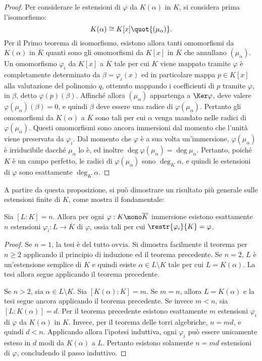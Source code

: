 \documentclass[12pt]{scrartcl}
\begin{document}
	\begin{proof}
		Per considerare le estensioni di $\varphi$ da $K(\alpha)$ in
		$K$, si considera prima l'isomorfismo:
		\[ K(\alpha) \cong K[x] \quot{(\mu_\alpha)}. \]
		Per il Primo teorema di isomorfismo, esistono
		allora tanti omomorfismi da $K(\alpha)$ in $\overline{K}$
		quanti sono gli omomorfismi da $K[x]$ in $\overline{K}$ che
		annullano $(\mu_\alpha)$. Un omomorfismo $\varphi_i$
		da $K[x]$ a $\overline{K}$ tale per cui $K$ viene mappato
		tramite $\varphi$ è completamente determinato da
		$\beta = \varphi_i(x)$ ed in particolare mappa $p \in K[x]$
		alla valutazione del polinomio $q$, ottenuto mappando i
		coefficienti di $p$ tramite $\varphi$, in $\beta$, detto
		$\varphi(p)(\beta)$. Affinché allora $(\mu_\alpha)$
		appartenga a $\Ker \varphi$, deve valere $\varphi(\mu_\alpha)(\beta) = 0$, e quindi
		$\beta$ deve essere una radice di $\varphi(\mu_\alpha)$. 
		Pertanto gli omomorfismi da $K(\alpha)$ a $\overline{K}$ sono
		tali per cui $\alpha$ venga mandato nelle radici di
		$\varphi(\mu_\alpha)$. Questi omomorfismi sono
		ancora immersioni dal momento che l'unità viene
		preservata da $\varphi_i$. Dal momento che $\varphi$ è
		a sua volta un'immersione, $\varphi(\mu_\alpha)$ è
		irriducibile dacché $\mu_\alpha$ lo è, ed inoltre
		$\deg \varphi(\mu_\alpha) = \deg \mu_\alpha$. Pertanto,
		poiché $K$ è un campo perfetto,
		le radici di $\varphi(\mu_\alpha)$ sono $\deg_K \alpha$,
		e quindi le estensioni di $\varphi$ sono esattamente
		$\deg_K \alpha$.
	\end{proof}
	
	A partire da questa proposizione, si può dimostrare un
	risultato più generale sulle estensioni finite di $K$,
	come mostra il fondamentale:
	
	\begin{theorem}
		Sia $[L : K] = n$. Allora per ogni $\varphi : K \mono \overline{K}$ immersione esistono esattamente $n$
		estensioni $\varphi_i : L \to \overline{K}$ di $\varphi$,
		ossia tali per cui $\restr{\varphi_i}{K} = \varphi$.	
	\end{theorem}
	
	\begin{proof}
		Se $n = 1$, la tesi è del tutto ovvia.
		Si dimostra facilmente il teorema per $n \geq 2$ applicando il principio di induzione ed il teorema precedente.
		Se $n = 2$, $L$ è un'estensione semplice di $K$ e quindi
		esiste $\alpha \in L \setminus K$
		tale per cui $L = K(\alpha)$.
		La tesi allora segue applicando il teorema precedente. \medskip
		

		Se $n > 2$, sia $\alpha \in L \setminus K$.
		Sia $[K(\alpha) : K] = m$. Se
		$m = n$, allora $L = K(\alpha)$ e la tesi
		segue ancora applicando il teorema precedente. Se invece
		$m < n$, sia $[L : K(\alpha)] = d$. Per il teorema precedente
		esistono esattamente $m$ estensioni $\varphi_i$ di $\varphi$ da $K(\alpha)$ in $K$. Invece, per il teorema delle torri algebriche,
		$n = md$, e quindi $d < n$. Applicando allora l'ipotesi
		induttiva, ogni $\varphi_i$ può essere unicamente
		esteso in $d$ modi da $K(\alpha)$ a $L$. Pertanto esistono
		solamente $n = md$ estensioni di $\varphi$, concludendo
		il passo induttivo. 
	\end{proof}
\end{document}
